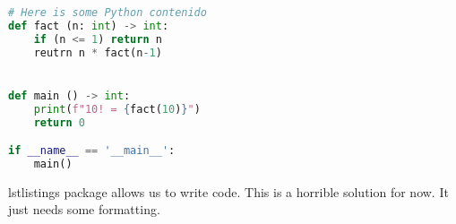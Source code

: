 
\begin{lstlisting}[language=Python]
# Here is some Python contenido
def fact (n: int) -> int:
    if (n <= 1) return n
    reutrn n * fact(n-1)


def main () -> int:
    print(f"10! = {fact(10)}")
    return 0

if __name__ == '__main__':
    main()
\end{lstlisting}

\begin{notebox}
    lstlistings package allows us to write code.
    This is a horrible solution for now.
    It just needs some formatting.
\end{notebox}
